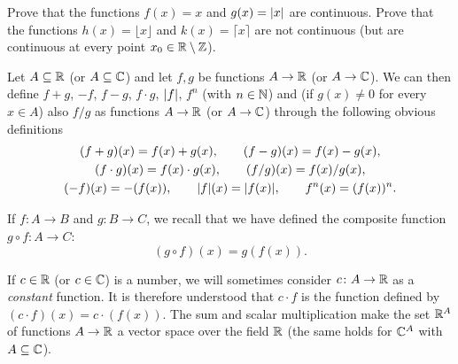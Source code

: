   \begin{exercise}
  Prove that the functions $f(x) = x$ and $g(x)={\left|x\right|}$ are continuous.
  Prove that the functions $h(x) = \lfloor x\rfloor$ and $k(x)=\lceil x \rceil$
  are not continuous (but are continuous at every point
  $x_0\in {\mathbb R} \setminus {\mathbb Z}$).
  \end{exercise}
  
  \begin{definition}
  Let $A \subseteq {\mathbb R}$ (or $A\subseteq {\mathbb C}$) 
  and let $f,g$ be functions $A \to {\mathbb R}$ (or $A\to {\mathbb C}$).
  We can then define
  $f+g$, $-f$, $f-g$, $f\cdot g$, ${\left|f\right|}$, $f^n$ (with $n\in {\mathbb N}$)
  and (if $g(x)\neq 0$ for every $x\in A$) also $f/g$
  as functions $A \to {\mathbb R}$ (or $A\to {\mathbb C}$) through the following obvious
  definitions
  \begin{gather*}
  (f+g)(x) = f(x) + g(x), \qquad
  (f-g)(x) = f(x) - g(x), \\
  (f\cdot g)(x) = f(x) \cdot g(x), \qquad
  (f/g)(x) = f(x) / g(x), \\
  (-f)(x) = -(f(x)), \qquad
  {\left|f\right|}(x) = {\left|f(x)\right|}, \qquad
  f^n(x) = (f(x))^n.
  \end{gather*}
  
  If $f\colon A \to B$ and $g\colon B\to C$, we recall
  that we have defined the composite function
  $g\circ f\colon A \to C$:
  \[
    (g\circ f)(x) = g(f(x)).
  \]
  
    If $c\in {\mathbb R}$ (or $c\in {\mathbb C}$) is a number, we will sometimes consider
  $c\colon A \to {\mathbb R}$ as a \emph{constant} function.
  It is therefore understood that $c\cdot f$ is the function defined by
  $(c\cdot f)(x) = c\cdot (f(x))$.
  The sum and scalar multiplication make the set ${\mathbb R}^A$
  of functions $A \to {\mathbb R}$ a vector space over the field ${\mathbb R}$
  (the same holds for ${\mathbb C}^A$ with $A\subseteq {\mathbb C}$).
  \end{definition}
  
